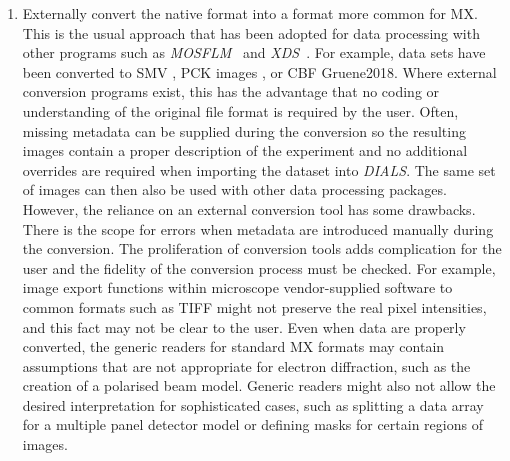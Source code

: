 \documentclass[preprint]{iucr}
\newcommand{\dials}{\emph{DIALS}\xspace}
\newcommand{\xds}{\emph{XDS}\xspace}
\newcommand{\mosflm}{\emph{MOSFLM}\xspace}
\begin{document}
\begin{enumerate}
  \item Externally convert the native format into a format more common for MX.
  This is the usual approach that has been adopted for data processing with
  other programs such as \mosflm~\cite{leslie2007} and
  \xds~\cite{kabsch2010xds}. For example, data sets have been converted to SMV
  \cite{Hattne2015}, PCK images \cite{Clabbers2017}, or CBF {Gruene2018}.
  Where external conversion programs exist, this has the advantage that no
  coding or understanding of the original file format is required by the user.
  Often, missing metadata can be supplied during the conversion so the
  resulting images contain a proper description of the experiment and no
  additional overrides are required when importing the dataset into \dials. The
  same set of images can then also be used with other data processing packages.
  However, the reliance on an external conversion tool has some drawbacks.
  There is the scope for errors when metadata are introduced manually during
  the conversion. The proliferation of conversion tools adds complication for
  the user and the fidelity of the conversion process must be checked. For
  example, image export functions within microscope vendor-supplied software to
  common formats such as TIFF might not preserve the real pixel intensities,
  and this fact may not be clear to the user. Even when data are properly
  converted, the generic readers for standard MX formats may contain
  assumptions that are not appropriate for electron diffraction, such as the
  creation of a polarised beam model. Generic readers might also not allow the
  desired interpretation for sophisticated cases, such as splitting a data
  array for a multiple panel detector model or defining masks for certain
  regions of images.


\end{enumerate}
\end{document}
